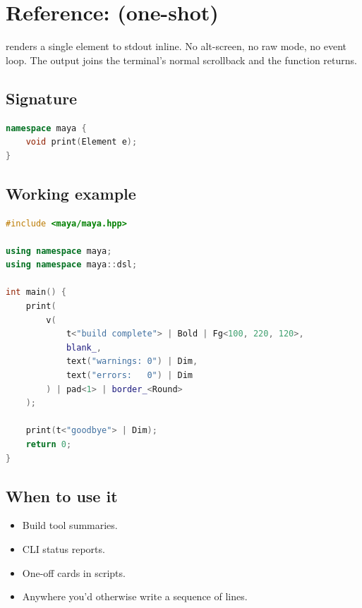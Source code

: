 \chapter{Reference:  (one-shot)}
\label{ch:refman-print}

\begin{aside}
 renders a single element to stdout
inline. No alt-screen, no raw mode, no event loop. The
output joins the terminal's normal scrollback and the
function returns.
\end{aside}

\section{Signature}

\begin{lstlisting}[language=C++]
namespace maya {
    void print(Element e);
}
\end{lstlisting}

\section{Working example}

\begin{lstlisting}[language=C++]
#include <maya/maya.hpp>

using namespace maya;
using namespace maya::dsl;

int main() {
    print(
        v(
            t<"build complete"> | Bold | Fg<100, 220, 120>,
            blank_,
            text("warnings: 0") | Dim,
            text("errors:   0") | Dim
        ) | pad<1> | border_<Round>
    );

    print(t<"goodbye"> | Dim);
    return 0;
}
\end{lstlisting}

\section{When to use it}

\begin{itemize}[leftmargin=*]
  \item Build tool summaries.
  \item CLI status reports.
  \item One-off cards in scripts.
  \item Anywhere you'd otherwise write a sequence of
     lines.
\end{itemize}

